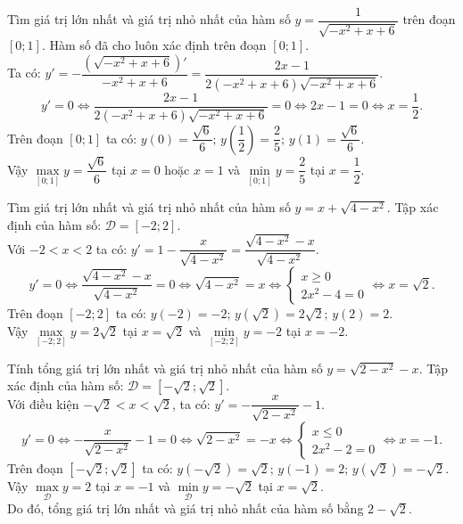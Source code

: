 \begin{bt}%
	Tìm giá trị lớn nhất và giá trị nhỏ nhất của hàm số $y = \dfrac{1}{\sqrt{-x^2 + x + 6}}$ trên đoạn $[0;1]$.
	\loigiai
	{
		Hàm số đã cho luôn xác định trên đoạn $[0;1]$.\\
		Ta có: $y' = -\dfrac{\left( \sqrt{-x^2 + x + 6} \right)'}{-x^2 + x + 6} = \dfrac{2x - 1}{2(-x^2 + x+ 6) \sqrt{-x^2 + x + 6}}$.
		$$y' = 0 \Leftrightarrow \dfrac{2x - 1}{2(-x^2 + x+ 6) \sqrt{-x^2 + x + 6}} = 0 \Leftrightarrow 2x - 1= 0 \Leftrightarrow x = \dfrac{1}{2}.$$
		Trên đoạn $[0;1]$ ta có: $y(0) = \dfrac{\sqrt{6}}{6}; \, y \left( \dfrac{1}{2} \right) = \dfrac{2}{5}; \, y(1) = \dfrac{\sqrt{6}}{6}$.\\
		Vậy $\max\limits_{[0;1]} y = \dfrac{\sqrt{6}}{6}$ tại $x = 0$ hoặc $x = 1$ và $\min\limits_{[0;1]} y = \dfrac{2}{5}$ tại $x = \dfrac{1}{2}$.
	}
\end{bt}



\begin{bt}%
	Tìm giá trị lớn nhất và giá trị nhỏ nhất của hàm số $y = x + \sqrt{4 - x^2}$.
	\loigiai
	{
		Tập xác định của hàm số: $\mathscr{D} = [-2;2]$.\\
		Với $-2 < x < 2$ ta có: $y' = 1 - \dfrac{x}{\sqrt{4 - x^2}} = \dfrac{\sqrt{4 - x^2} - x}{\sqrt{4 - x^2}}$.
		$$y' = 0 \Leftrightarrow \dfrac{\sqrt{4 - x^2} - x}{\sqrt{4 - x^2}} = 0 \Leftrightarrow \sqrt{4 - x^2} = x \Leftrightarrow \begin{cases} x \geq 0 \\ 2x^2 - 4 = 0  \end{cases} \Leftrightarrow x = \sqrt{2}.$$
		Trên đoạn $[-2;2]$ ta có: $y(-2) = -2; \, y \left( \sqrt{2} \right) = 2 \sqrt{2}; \, y(2) = 2$.\\
		Vậy $\max\limits_{[-2;2]} y = 2 \sqrt{2}$ tại $x = \sqrt{2}$ và $\min\limits_{[-2;2]} y = -2$ tại $x = -2$.
	}
\end{bt}


\begin{bt}%
	Tính tổng giá trị lớn nhất và giá trị nhỏ nhất của hàm số $y=\sqrt{2-x^2}-x$.
	\loigiai
	{
		Tập xác định của hàm số: $\mathscr{D}=\left[-\sqrt{2}; \sqrt{2}\right]$.\\
		Với điều kiện $-\sqrt{2}<x<\sqrt{2}$, ta có: $y'=-\dfrac{x}{\sqrt{2-x^2}}-1$.
		$$y'=0 \Leftrightarrow -\dfrac{x}{\sqrt{2-x^2}}-1 = 0 \Leftrightarrow \sqrt{2 - x^2} = -x \Leftrightarrow \begin{cases} x \leq 0 \\ 2x^2 - 2 = 0 \end{cases} \Leftrightarrow x=-1.$$
		Trên đoạn $\left[-\sqrt{2}; \sqrt{2}\right]$ ta có:  $y(-\sqrt{2}) = \sqrt{2}$; $y(-1) = 2$;
		$y(\sqrt{2}) = -\sqrt{2}$.\\
		Vậy $\max\limits_{\mathscr{D}} y = 2$ tại $x = -1$ và $\min\limits_{\mathscr{D}} y = -\sqrt{2}$ tại $x = \sqrt{2}$.\\
		Do đó, tổng giá trị lớn nhất và giá trị nhỏ nhất của hàm số bằng $2-\sqrt{2}$.
	}
\end{bt}


